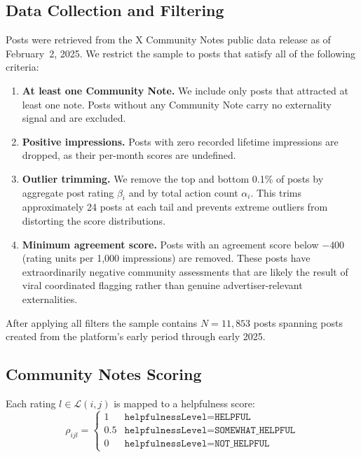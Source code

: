 \documentclass[11pt]{article}
\begin{document}
\subsection{Data Collection and Filtering}
\label{sec:filtering}

Posts were retrieved from the X Community Notes public data release as of
February~2, 2025.
We restrict the sample to posts that satisfy all of the following criteria:

\begin{enumerate}
    \item \textbf{At least one Community Note.}
    We include only posts that attracted at least one note.
    Posts without any Community Note carry no externality signal and are excluded.

    \item \textbf{Positive impressions.}
    Posts with zero recorded lifetime impressions are dropped, as their
    per-month scores are undefined.

    \item \textbf{Outlier trimming.}
    We remove the top and bottom 0.1\% of posts by aggregate post rating
    $\beta_i$ and by total action count $\alpha_i$.
    This trims approximately 24 posts at each tail and prevents extreme outliers
    from distorting the score distributions.

    \item \textbf{Minimum agreement score.}
    Posts with an agreement score below $-400$ (rating units per 1{,}000
    impressions) are removed.
    These posts have extraordinarily negative community assessments that are
    likely the result of viral coordinated flagging rather than genuine
    advertiser-relevant externalities.
\end{enumerate}

After applying all filters the sample contains $N = 11{,}853$ posts spanning
posts created from the platform's early period through early 2025.

\subsection{Community Notes Scoring}
\label{sec:notes}

Each rating $l \in \mathcal{L}(i,j)$ is mapped to a helpfulness score:
\begin{equation}
    \rho_{ijl} =
    \begin{cases}
        1   & \texttt{helpfulnessLevel} = \texttt{HELPFUL} \\
        0.5 & \texttt{helpfulnessLevel} = \texttt{SOMEWHAT\_HELPFUL} \\
        0   & \texttt{helpfulnessLevel} = \texttt{NOT\_HELPFUL}
    \end{cases}
\end{equation}
\end{document}
